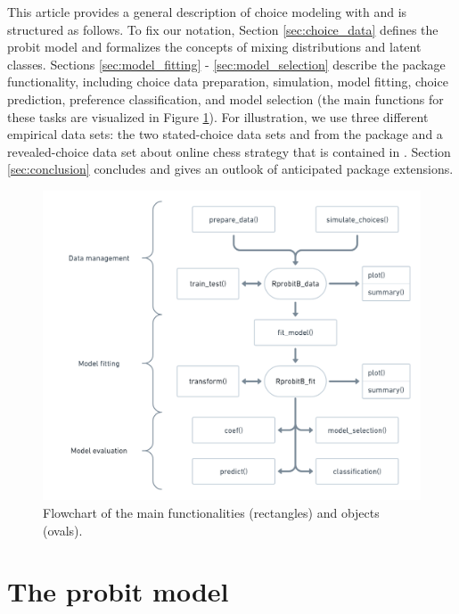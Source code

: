 \documentclass[article,shortnames]{jss}
\begin{document}
This article provides a general description of choice modeling with  and is structured as follows. To fix our notation, Section \ref{sec:choice_data} defines the probit model and formalizes the concepts of mixing distributions and latent classes. Sections \ref{sec:model_fitting} - \ref{sec:model_selection} describe the package functionality, including choice data preparation, simulation, model fitting, choice prediction, preference classification, and model selection (the main functions for these tasks are visualized in Figure \ref{fig:flowchart}). For illustration, we use three different empirical data sets: the two stated-choice data sets  and  from the  package and a revealed-choice data set about online chess strategy that is contained in . Section \ref{sec:conclusion} concludes and gives an outlook of anticipated package extensions.

\begin{figure}[!ht]
  \includegraphics{flowchart.png}
  \caption{Flowchart of the main  functionalities (rectangles) and objects (ovals).}
  \label{fig:flowchart}
\end{figure}

\section{The probit model} \label{sec:probit_model}
\end{document}
